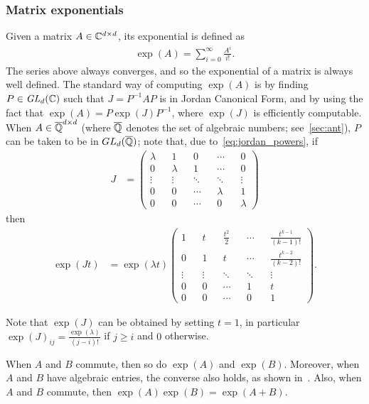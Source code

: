 \subsubsection{Matrix exponentials}
\label{sec:matrix_exp}

Given a matrix $A \in \mathbb{C}^{d \times d}$, its exponential is defined as
\begin{align*}
\exp(A) = \sum \limits_{i=0}^{\infty} \frac{A^{i}}{i!} .
\end{align*}
The series above always converges, and so the exponential of a matrix is always well defined.
The standard way of computing $\exp(A)$ is by finding $P \in \mathit{GL}_{d}(\mathbb{C})$ such that $J=P^{-1}AP$ is in Jordan Canonical Form, and by using the fact that $\exp(A) = P \exp(J) P^{-1}$, where $\exp(J)$ is efficiently computable.
When $A \in \overline{\mathbb{Q}}^{d \times d}$ (where $\overline{\mathbb{Q}}$ denotes the set of algebraic numbers; see~\cref{sec:ant}), $P$ can be taken to be in $GL_{d}(\overline{\mathbb{Q}})$; note that, due to~\cref{eq:jordan_powers}, if
\begin{align*}
J &= \begin{pmatrix}
\lambda && 1 && 0 && \cdots && 0 \\
0 && \lambda && 1 &&\cdots && 0 \\
\vdots && \vdots && \ddots && \ddots && \vdots \\
0 && 0 && \cdots && \lambda && 1 \\
0 && 0 && \cdots && 0 && \lambda
\end{pmatrix}
\end{align*}
then
\begin{align*}
\exp(Jt) &= \exp(\lambda t) \begin{pmatrix}
1 && t && \frac{t^{2}}{2} && \cdots && \frac{t^{k-1}}{(k-1)!} \\
0 && 1 && t && \cdots && \frac{t^{k-2}}{(k-2)!} \\
\vdots && \vdots &&\ddots && \ddots && \vdots \\
0 && 0 && \cdots && 1 && t \\
0 && 0 && \cdots && 0 && 1
\end{pmatrix} .
\end{align*}

Note that $\exp{(J)}$ can be obtained by setting $t=1$, in particular $\exp{(J)}_{ij} = \frac{\exp(\lambda)}{(j-i)!}$ if $j \geq i$ and $0$ otherwise.

When $A$ and $B$ commute, then so do $\exp(A)$ and $\exp(B)$. Moreover, when $A$ and $B$ have algebraic entries, the converse also holds, as shown in~\cite{MatrixExps}. Also, when $A$ and $B$ commute, then $\exp{(A)}\exp{(B)} = \exp{(A+B)}$.

